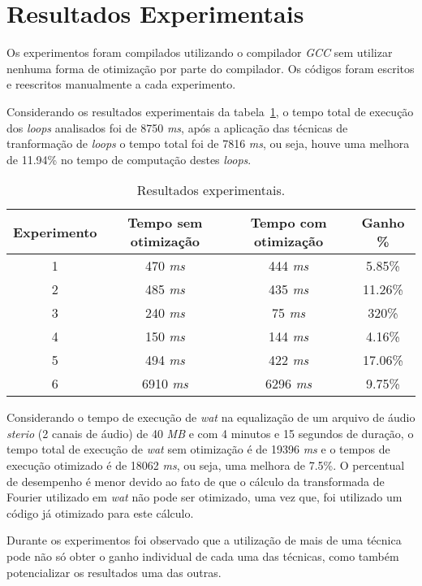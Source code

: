 \section{Resultados Experimentais}

Os experimentos foram compilados utilizando o compilador \textit{GCC} sem 
utilizar nenhuma forma de otimização por parte do compilador.
Os códigos foram escritos e reescritos manualmente a cada experimento.

Considerando os resultados experimentais da tabela~\ref{tabela_resultados},
o tempo total de execução dos \textit{loops} analisados foi de 8750 \textit{ms},
após a aplicação das técnicas de tranformação de \textit{loops} o tempo total
foi de 7816 \textit{ms}, ou seja, houve uma melhora de 11.94\% no tempo de  
computação destes \textit{loops}.

\begin{table}[ht]
  \label{tabela_resultados}
\begin{center}
  \begin{tabular}{|c|c|c|c|}
    \hline
    \textbf{Experimento} & \textbf{Tempo sem otimização} & \textbf{Tempo com
          otimização} & \textbf{Ganho} \%\\
    \hline
    1 & 470 \textit{ms} & 444 \textit{ms} & 5.85\% \\
    \hline
    2 & 485 \textit{ms} & 435 \textit{ms} & 11.26\% \\
    \hline
    3 & 240 \textit{ms} & 75 \textit{ms} & 320\% \\
    \hline
    4 & 150 \textit{ms} & 144 \textit{ms} & 4.16\% \\
    \hline
    5 & 494 \textit{ms} & 422 \textit{ms} & 17.06\% \\
    \hline
    6 & 6910 \textit{ms} & 6296 \textit{ms} & 9.75\% \\
    \hline
  \end{tabular}
  \caption{Resultados experimentais.}
\end{center}
\end{table}

Considerando o tempo de execução de \textit{wat} na equalização de um
arquivo de áudio \textit{sterio} (2 canais de áudio) de 40 \textit{MB} e
com 4 minutos e 15 segundos de duração, o tempo total de execução de \textit{wat} 
sem otimização é de 19396 \textit{ms} 
e o tempos de execução otimizado é de 18062 \textit{ms}, ou seja, uma melhora de 
7.5\%. 
O percentual de desempenho é menor devido ao fato de que o cálculo da
transformada de Fourier \cite{fft} utilizado em \textit{wat} não pode ser otimizado, uma
vez que, foi utilizado um código já otimizado para este cálculo.

Durante os experimentos foi observado que a utilização de mais de uma técnica
pode não só obter o ganho individual de cada uma das técnicas, como também 
potencializar os resultados uma das outras.

